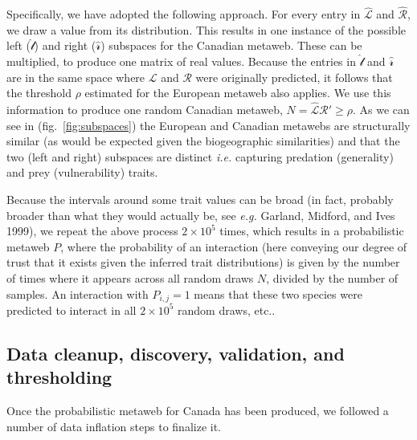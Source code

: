 \documentclass[10pt,oneside]{article}
\begin{document}
Specifically, we have adopted the following approach. For every entry in
\(\hat{\mathcal{L}}\) and \(\hat{\mathcal{R}}\), we draw a value from
its distribution. This results in one instance of the possible left
(\(\hat{\mathcal{l}}\)) and right (\(\hat{\mathcal{r}}\)) subspaces for
the Canadian metaweb. These can be multiplied, to produce one matrix of
real values. Because the entries in \(\hat{\mathcal{l}}\) and
\(\hat{\mathcal{r}}\) are in the same space where \(\mathcal{L}\) and
\(\mathcal{R}\) were originally predicted, it follows that the threshold
\(\rho\) estimated for the European metaweb also applies. We use this
information to produce one random Canadian metaweb,
\(N = \hat{\mathcal{L}}\)\(\hat{\mathcal{R}}' \ge \rho\). As we can see
in (fig.~\ref{fig:subspaces}) the European and Canadian metawebs are
structurally similar (as would be expected given the biogeographic
similarities) and that the two (left and right) subspaces are distinct
\emph{i.e.} capturing predation (generality) and prey (vulnerability)
traits.

Because the intervals around some trait values can be broad (in fact,
probably broader than what they would actually be, see \emph{e.g.}
Garland, Midford, and Ives 1999), we repeat the above process
\(2\times 10^5\) times, which results in a probabilistic metaweb \(P\),
where the probability of an interaction (here conveying our degree of
trust that it exists given the inferred trait distributions) is given by
the number of times where it appears across all random draws \(N\),
divided by the number of samples. An interaction with \(P_{i,j} = 1\)
means that these two species were predicted to interact in all
\(2\times 10^5\) random draws, etc..

\hypertarget{data-cleanup-discovery-validation-and-thresholding}{%
\subsection{Data cleanup, discovery, validation, and
thresholding}\label{data-cleanup-discovery-validation-and-thresholding}}

Once the probabilistic metaweb for Canada has been produced, we followed
a number of data inflation steps to finalize it.
\end{document}
